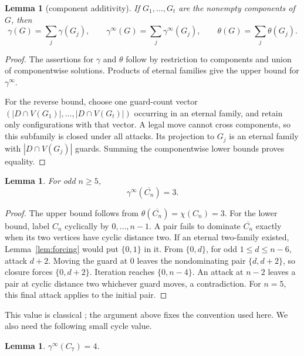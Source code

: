 \documentclass[11pt]{article}
\newtheorem{lemma}[theorem]{Lemma}
\theoremstyle{definition}
\theoremstyle{remark}
\newcommand{\gaminf}{\gamma^{\infty}}
\newcommand{\V}{V}
\begin{document}
\begin{lemma}[component additivity]\label{lem:additivity}
If \(G_1,\ldots,G_t\) are the nonempty components of \(G\), then
\[
 \gamma(G)=\sum_j\gamma(G_j),\qquad
 \gaminf(G)=\sum_j\gaminf(G_j),\qquad
 \theta(G)=\sum_j\theta(G_j).
\tag{2.5}
\]
\end{lemma}

\begin{proof}
The assertions for \(\gamma\) and \(\theta\) follow by restriction to
components and union of componentwise solutions.  Products of eternal
families give the upper bound for \(\gaminf\).

For the reverse bound, choose one guard-count vector
\((|D\cap\V(G_1)|,\ldots,|D\cap\V(G_t)|)\) occurring in an eternal family,
and retain only configurations with that vector.  A legal move cannot cross
components, so this subfamily is closed under all attacks.  Its projection
to \(G_j\) is an eternal family with \(|D\cap\V(G_j)|\) guards.  Summing the
componentwise lower bounds proves equality.
\end{proof}

\begin{lemma}\label{lem:odd-antihole}
For odd \(n\geq5\),
\[
  \gaminf(\overline{C_n})=3.
\tag{2.6}
\]
\end{lemma}

\begin{proof}
The upper bound follows from
\(\theta(\overline{C_n})=\chi(C_n)=3\).  For the lower bound, label \(C_n\)
cyclically by \(0,\ldots,n-1\).  A pair fails to dominate
\(\overline{C_n}\) exactly when its two vertices have cyclic distance two.
If an eternal two-family existed, Lemma~\ref{lem:forcing} would put
\(\{0,1\}\) in it.  From \(\{0,d\}\), for odd
\(1\leq d\leq n-6\), attack \(d+2\).  Moving the guard at \(0\) leaves the
nondominating pair \(\{d,d+2\}\), so closure forces
\(\{0,d+2\}\).  Iteration reaches \(\{0,n-4\}\).  An attack at \(n-2\)
leaves a pair at cyclic distance two whichever guard moves, a
contradiction.  For \(n=5\), this final attack applies to the initial pair.
\end{proof}

This value is classical \cite{GoddardHedetniemiHedetniemi2005}; the argument
above fixes the convention used here.  We also need the following small
cycle value.

\begin{lemma}\label{lem:c7}
\(\gaminf(C_7)=4\).
\end{lemma}
\end{document}
